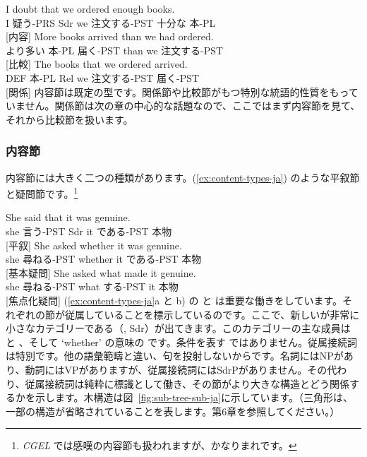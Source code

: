 \ea \label{ex:sub-types-ja}
    \ea \gll I doubt that we ordered enough books.\\
        I 疑う-PRS Sdr we 注文する-PST 十分な 本-PL\\
    \glt {} [内容]
    \ex \gll More books arrived than we had ordered.\\
        より多い 本-PL 届く-PST than we 注文する-PST\\
    \glt {} [比較]
    \ex \gll The books that we ordered arrived.\\
        DEF 本-PL Rel we 注文する-PST 届く-PST\\
    \glt {} [関係]
    \z
\z
内容節は既定の型です。関係節や比較節がもつ特別な統語的性質をもっていません。関係節は次の章の中心的な話題なので、ここではまず内容節を見て、それから比較節を扱います。

\subsubsection{内容節}

内容節には大きく二つの種類があります。(\ref{ex:content-types-ja}) のような平叙節と疑問節です。\footnote{\textit{CGEL} では感嘆の内容節も扱われますが、かなりまれです。}

\ea \label{ex:content-types-ja}
    \ea \gll She said that it was genuine.\\
        she 言う-PST Sdr it である-PST 本物\\
    \glt {} [平叙]
    \ex \gll She asked whether it was genuine.\\
        she 尋ねる-PST whether it である-PST 本物\\
    \glt {} [基本疑問]
    \ex \gll She asked what made it genuine.\\
        she 尋ねる-PST what する-PST it 本物\\
    \glt {} [焦点化疑問]
    \z
\z
(\ref{ex:content-types-ja}a と b) の  と  は重要な働きをしています。それぞれの節が従属していることを標示しているのです。ここで、新しいが非常に小さなカテゴリーである（, Sdr）が出てきます。このカテゴリーの主な成員は  と 、そして `whether' の意味の  です。条件を表す  ではありません。従属接続詞は特別です。他の語彙範疇と違い、句を投射しないからです。名詞にはNPがあり、動詞にはVPがありますが、従属接続詞にはSdrPがありません。その代わり、従属接続詞は純粋に標識として働き、その節がより大きな構造とどう関係するかを示します。木構造は図~\ref{fig:sub-tree-sub-ja}に示しています。（三角形は、一部の構造が省略されていることを表します。第6章を参照してください。）

